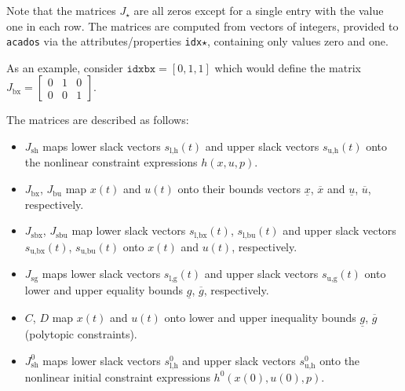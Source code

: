 \documentclass[english]{article}
\newcommand{\acados}{\texttt{acados}}
\newcommand{\ind}[1]{_{\textrm{#1}}}
\newcommand{\initial}{^{\textrm{0}}}
\begin{document}
Note that the matrices $J_{\star}$ are all zeros except for a single entry with the value one in each row.
The matrices are computed from vectors of integers, provided to \acados{} via the attributes/properties \texttt{idx}$\star$, containing only values zero and one.

As an example, consider $\texttt{idxbx} = [0, 1, 1]$ which would define the matrix $J\ind{bx} = \begin{bmatrix} 0 & 1 & 0 \\ 0 & 0 & 1 \end{bmatrix}$.


The matrices are described as follows:
\begin{itemize}
    \item $J\ind{sh}$ maps lower slack vectors $s\ind{l,h}(t)$ and upper slack vectors $s\ind{u,h}(t)$ onto the nonlinear constraint expressions $h(x,u,p)$.
    \item $J\ind{bx}$, $J\ind{bu}$ map $x(t)$ and $u(t)$ onto their bounds vectors $\underline{x}$, $\overline{x}$ and $\underline{u}$, $\overline{u}$, respectively.
    \item $J\ind{sbx}$, $J\ind{sbu}$ map lower slack vectors $s\ind{l,bx}(t)$, $s\ind{l,bu}(t)$ and upper slack vectors $s\ind{u,bx}(t)$, $s\ind{u,bu}(t)$ onto $x(t)$ and $u(t)$, respectively.
    \item $J\ind{sg}$ maps lower slack vectors $s\ind{l,g}(t)$ and upper slack vectors $s\ind{u,g}(t)$ onto lower and upper equality bounds $\underline{g}$, $\overline{g}$, respectively.
    \item $C$, $D$ map $x(t)$ and $u(t)$ onto lower and upper inequality bounds $\underline{g}$, $\overline{g}$ (polytopic constraints).
    \item $J\ind{sh}\initial$ maps lower slack vectors $s\ind{l,h}\initial$ and upper slack vectors $s\ind{u,h}\initial$ onto the nonlinear initial constraint expressions $h\initial(x(0),u(0),p)$.
\end{itemize}
\end{document}
